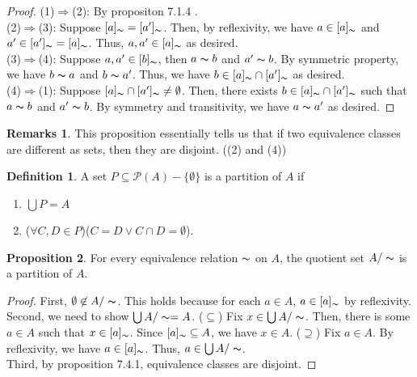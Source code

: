 \documentclass[14pt]{article}
\theoremstyle{definition}
\newtheorem*{remark}{Remarks}
\newtheorem{definition}{Definition}[subsection]
\newtheorem{proposition}[definition]{Proposition}
\newcommand{\eq}{\thicksim}
\newcommand{\quotient}{A/\thicksim}
\begin{document}
\begin{proof}
    (1)$\Rightarrow$(2): By propositon 7.1.4 .\\
    (2)$\Rightarrow$(3): Suppose $[a]_{\thicksim}=[a']_{\thicksim}$. Then, by reflexivity, we have
    $a\in[a]_{\eq}$ and $a'\in [a']_{\eq}=[a]_{\eq}$. Thus, $a,a'\in [a]_{\eq}$ as desired.\\
    (3)$\Rightarrow$(4): Suppose  $a,a'\in[b]_{\thicksim}$, then $a\eq b$ and $a'\eq b$. 
    By symmetric property, we have $b\eq a$ and $b\eq a'$. Thus, we have $b\in [a]_{\thicksim}\cap [a']_{\thicksim}$
    as desired.\\
    (4)$\Rightarrow$(1): Suppose $[a]_{\thicksim}\cap [a']_{\thicksim}\not=\emptyset$. Then, there exists
    $b\in [a]_{\thicksim}\cap [a']_{\thicksim}$ such that $a\eq b$ and $a'\eq b$.
    By symmetry and transitivity, we have $a\eq a'$ as desired.

\end{proof}

\begin{remark}
    This proposition essentially tells us that if two equivalence classes are different as sets, 
    then they are disjoint. ((2) and (4))
\end{remark}

\vspace{3mm}

\begin{definition}
    A set $P\subseteq \mathcal{P}(A)-\{\emptyset\}$ is a partition of $A$ if
    \begin{enumerate}
        \item $\bigcup P=A $
        \item ($\forall C, D \in P$)($C=D \vee C\cap D=\emptyset$).
    \end{enumerate}
\end{definition}

\vspace{2mm}

\begin{proposition}
    For every equivalence relation $\eq$ on $A$, the quotient set $A/\eq$ is a partition of $A$.
\end{proposition}

\begin{proof}
    First, $\emptyset\not\in \quotient$. This holds because for each $a\in A$, 
    $a\in[a]_{\eq}$ by reflexivity.\\
    Second, we need to show $\bigcup \quotient=A $. ($\subseteq$) Fix $x\in \bigcup \quotient $.
    Then, there is some $a\in A$ such that $x\in [a]_{\eq}$. Since $[a]_{\eq}\subseteq A$, 
    we have $x\in A$. ($\supseteq$) Fix $a\in A$. By reflexivity, we have $a\in[a]_{\eq}$.
    Thus, $a\in \bigcup \quotient$.\\
    Third, by proposition 7.4.1, equivalence classes are disjoint.
\end{proof}
\end{document}
